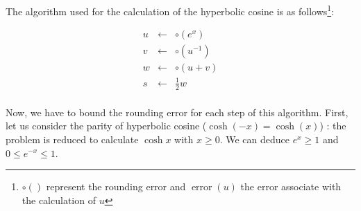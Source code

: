 \documentclass[12pt]{amsart}
\DeclareMathOperator{\error}{error}
\begin{document}
The algorithm used for the calculation of the hyperbolic cosine is as follows\footnote{$\circ()$ represent the rounding error and $\error(u)$ the
  error associate with the calculation of $u$}:

\begin{eqnarray}\nonumber
u&\leftarrow&\circ(e^x)\\\label{coshalgo1}
v&\leftarrow&\circ({u}^{-1})\\\label{coshalgo2}
w&\leftarrow&\circ(u+v)\\\label{coshalgo3}
s&\leftarrow&\frac{1}{2} w\\\label{coshalgo4}
\end{eqnarray}

Now, we have to bound the rounding error for each step of this
algorithm.  First, let us consider the parity of hyperbolic cosine
($\cosh(-x)=\cosh(x)$) : the problem is reduced to calculate $\cosh x$
with $x \geq 0$. We can deduce $e^x \geq 1$ and $0 \leq e^{-x} \leq
1$.
\end{document}
